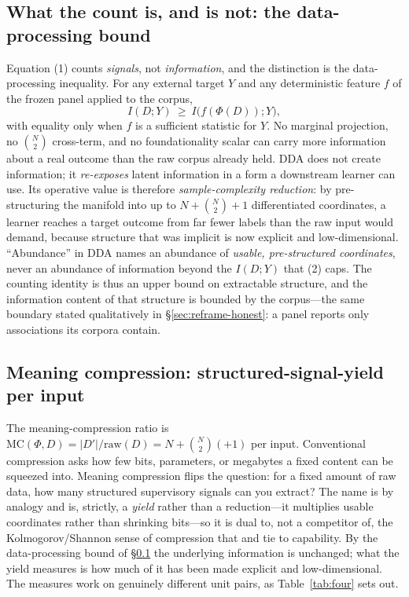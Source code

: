 \documentclass[10pt,twocolumn]{article}
\begin{document}
\subsection{What the count is, and is not: the data-processing bound}
\label{sec:dpi}
Equation (1) counts \emph{signals}, not \emph{information}, and the distinction is
the data-processing inequality. For any external target $Y$ and any deterministic
feature $f$ of the frozen panel applied to the corpus,
\begin{equation}
I(D;Y)\ \ge\ I\bigl(f(\Phi(D));Y\bigr),\tag{2}
\end{equation}
with equality only when $f$ is a sufficient statistic for $Y$. No marginal
projection, no $\binom{N}{2}$ cross-term, and no foundationality scalar can carry
more information about a real outcome than the raw corpus already held. DDA does
not create information; it \emph{re-exposes} latent information in a form a
downstream learner can use. Its operative value is therefore \emph{sample-complexity
reduction}: by pre-structuring the manifold into up to $N+\binom{N}{2}+1$
differentiated coordinates, a learner reaches a target outcome from far fewer
labels than the raw input would demand, because structure that was implicit is now
explicit and low-dimensional. ``Abundance'' in DDA names an abundance of
\emph{usable, pre-structured coordinates}, never an abundance of information beyond
the $I(D;Y)$ that (2) caps. The counting identity is thus an upper bound on
extractable structure, and the information content of that structure is bounded by
the corpus---the same boundary stated qualitatively in
\S\ref{sec:reframe-honest}: a panel reports only associations its corpora contain.

\subsection{Meaning compression: structured-signal-yield per input}
\label{sec:mc-fourth}
The meaning-compression ratio is
$\mathrm{MC}(\Phi,D) = |D'|/\mathrm{raw}(D) = N+\binom{N}{2}(+1)$ per input.
Conventional compression asks how few bits, parameters, or megabytes a fixed
content can be squeezed into. Meaning compression flips the question: for a fixed
amount of raw data, how many structured supervisory signals can you extract? The
name is by analogy and is, strictly, a \emph{yield} rather than a reduction---it
multiplies usable coordinates rather than shrinking bits---so it is dual to, not
a competitor of, the Kolmogorov/Shannon sense of compression that
\citet{deletang2024compression} and \citet{huang2024compression} tie to
capability. By the data-processing bound of \S\ref{sec:dpi} the underlying
information is unchanged; what the yield measures is how much of it has been made
explicit and low-dimensional. The measures work on genuinely different unit
pairs, as Table~\ref{tab:four} sets out.
\end{document}
